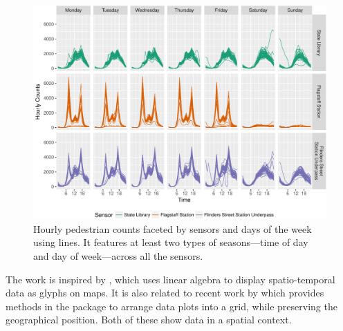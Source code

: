 \documentclass[article]{jss}
\theoremstyle{definition}
\theoremstyle{definition}
\theoremstyle{remark}
\begin{document}
\begin{CodeChunk}
\begin{figure}

{\centering \includegraphics[width=\textwidth]{figure/facet-time-1} 

}

\caption[Hourly pedestrian counts faceted by sensors and
days of the week using lines. It features at least two types of
seasons---time of day and day of week---across all the sensors.]{Hourly pedestrian counts faceted by sensors and
days of the week using lines. It features at least two types of
seasons---time of day and day of week---across all the sensors.}\label{fig:facet-time}
\end{figure}
\end{CodeChunk}





The work is inspired by \citet{Wickham2012glyph}, which uses linear
algebra to display spatio-temporal data as glyphs on maps. It is also
related to recent work by \citet{R-geofacet} which provides methods in
the  package to arrange data plots into a grid, while
preserving the geographical position. Both of these show data in a
spatial context.
\end{document}
